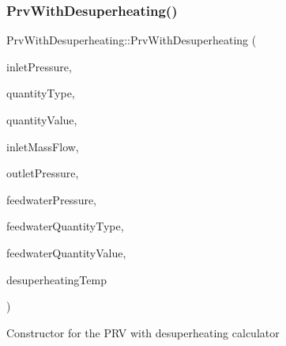 \subsubsection{\texorpdfstring{Prv\+With\+Desuperheating()}{PrvWithDesuperheating()}\hspace{0.1cm}{\footnotesize\ttfamily [2/3]}}
{\footnotesize\ttfamily Prv\+With\+Desuperheating\+::\+Prv\+With\+Desuperheating (\begin{DoxyParamCaption}\item[{double}]{inlet\+Pressure,  }\item[{\hyperlink{class_steam_properties_ae0294bedf7d178c2d8fb6aed0f62fbff}{Steam\+Properties\+::\+Thermodynamic\+Quantity}}]{quantity\+Type,  }\item[{double}]{quantity\+Value,  }\item[{double}]{inlet\+Mass\+Flow,  }\item[{double}]{outlet\+Pressure,  }\item[{double}]{feedwater\+Pressure,  }\item[{\hyperlink{class_steam_properties_ae0294bedf7d178c2d8fb6aed0f62fbff}{Steam\+Properties\+::\+Thermodynamic\+Quantity}}]{feedwater\+Quantity\+Type,  }\item[{double}]{feedwater\+Quantity\+Value,  }\item[{double}]{desuperheating\+Temp }\end{DoxyParamCaption})}

Constructor for the P\+RV with desuperheating calculator


